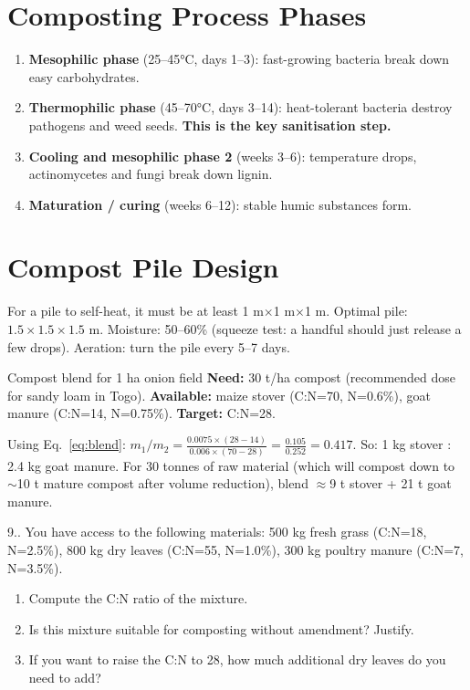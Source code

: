 \documentclass[12pt,a4paper,openany]{book}
\newcounter{exoctr}[chapter]
\renewcommand{\theexoctr}{\thechapter.\arabic{exoctr}}
\begin{document}
\section{Composting Process Phases}

\begin{enumerate}[leftmargin=2em]
  \item \textbf{Mesophilic phase} (25--45°C, days 1--3): fast-growing bacteria break down easy carbohydrates.
  \item \textbf{Thermophilic phase} (45--70°C, days 3--14): heat-tolerant bacteria destroy pathogens and weed seeds. \textbf{This is the key sanitisation step.}
  \item \textbf{Cooling and mesophilic phase 2} (weeks 3--6): temperature drops, actinomycetes and fungi break down lignin.
  \item \textbf{Maturation / curing} (weeks 6--12): stable humic substances form.
\end{enumerate}

\section{Compost Pile Design}

For a pile to self-heat, it must be at least 1 m$\times$1 m$\times$1 m. Optimal pile: $1.5\times1.5\times1.5$ m. Moisture: 50--60\% (squeeze test: a handful should just release a few drops). Aeration: turn the pile every 5--7 days.

\begin{exbox}{Compost blend for 1 ha onion field}
\textbf{Need:} 30 t/ha compost (recommended dose for sandy loam in Togo).
\textbf{Available:} maize stover (C:N=70, N=0.6\%), goat manure (C:N=14, N=0.75\%).
\textbf{Target:} C:N=28.

Using Eq.~\eqref{eq:blend}: $m_1/m_2 = \frac{0.0075\times(28-14)}{0.006\times(70-28)}=\frac{0.105}{0.252}=0.417$.
So: 1 kg stover : 2.4 kg goat manure. For 30 tonnes of raw material (which will compost down to $\sim$10 t mature compost after volume reduction), blend $\approx$9 t stover + 21 t goat manure.
\end{exbox}

\begin{exobox}{9.\theexoctr}
You have access to the following materials: 500 kg fresh grass (C:N=18, N=2.5\%), 800 kg dry leaves (C:N=55, N=1.0\%), 300 kg poultry manure (C:N=7, N=3.5\%).
\begin{enumerate}[label=(\alph*)]
  \item Compute the C:N ratio of the mixture.
  \item Is this mixture suitable for composting without amendment? Justify.
  \item If you want to raise the C:N to 28, how much additional dry leaves do you need to add?
\end{enumerate}
\end{exobox}
\end{document}
